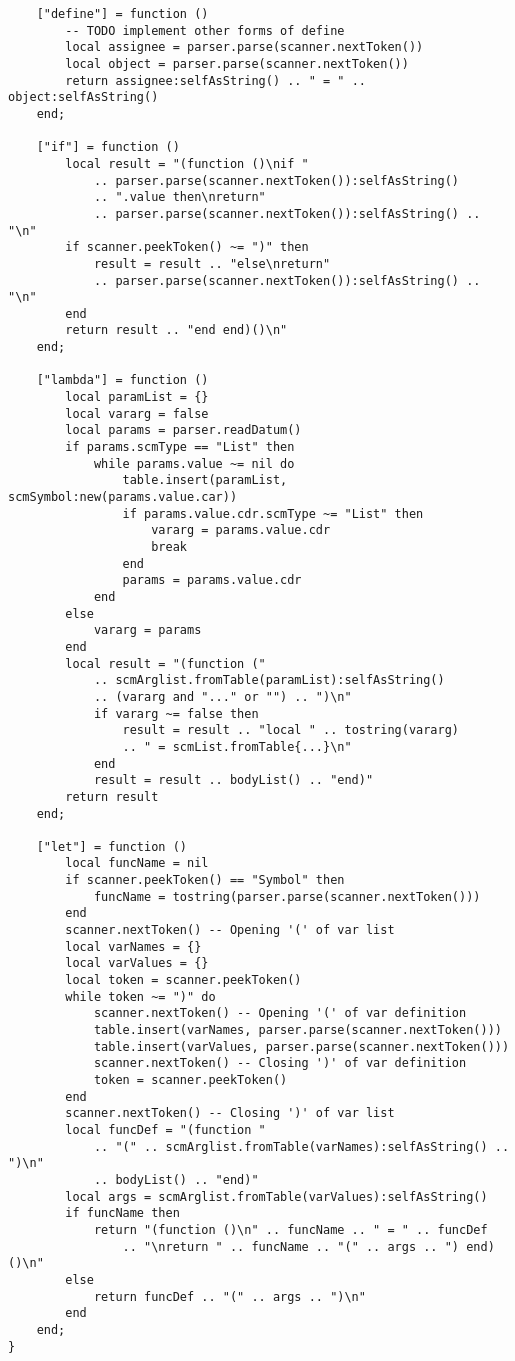 \begin{verbatim}
    ["define"] = function ()
        -- TODO implement other forms of define
        local assignee = parser.parse(scanner.nextToken())
        local object = parser.parse(scanner.nextToken())
        return assignee:selfAsString() .. " = " .. object:selfAsString()
    end;

    ["if"] = function ()
        local result = "(function ()\nif "
            .. parser.parse(scanner.nextToken()):selfAsString()
            .. ".value then\nreturn"
            .. parser.parse(scanner.nextToken()):selfAsString() .. "\n"
        if scanner.peekToken() ~= ")" then
            result = result .. "else\nreturn"
            .. parser.parse(scanner.nextToken()):selfAsString() .. "\n"
        end
        return result .. "end end)()\n"
    end;

    ["lambda"] = function ()
        local paramList = {}
        local vararg = false
        local params = parser.readDatum()
        if params.scmType == "List" then
            while params.value ~= nil do
                table.insert(paramList, scmSymbol:new(params.value.car))
                if params.value.cdr.scmType ~= "List" then
                    vararg = params.value.cdr
                    break
                end
                params = params.value.cdr
            end
        else
            vararg = params
        end
        local result = "(function ("
            .. scmArglist.fromTable(paramList):selfAsString()
            .. (vararg and "..." or "") .. ")\n"
            if vararg ~= false then
                result = result .. "local " .. tostring(vararg)
                .. " = scmList.fromTable{...}\n"
            end
            result = result .. bodyList() .. "end)"
        return result
    end;

    ["let"] = function ()
        local funcName = nil
        if scanner.peekToken() == "Symbol" then
            funcName = tostring(parser.parse(scanner.nextToken()))
        end
        scanner.nextToken() -- Opening '(' of var list
        local varNames = {}
        local varValues = {}
        local token = scanner.peekToken()
        while token ~= ")" do
            scanner.nextToken() -- Opening '(' of var definition
            table.insert(varNames, parser.parse(scanner.nextToken()))
            table.insert(varValues, parser.parse(scanner.nextToken()))
            scanner.nextToken() -- Closing ')' of var definition
            token = scanner.peekToken()
        end
        scanner.nextToken() -- Closing ')' of var list
        local funcDef = "(function "
            .. "(" .. scmArglist.fromTable(varNames):selfAsString() .. ")\n"
            .. bodyList() .. "end)"
        local args = scmArglist.fromTable(varValues):selfAsString()
        if funcName then
            return "(function ()\n" .. funcName .. " = " .. funcDef
                .. "\nreturn " .. funcName .. "(" .. args .. ") end)()\n"
        else
            return funcDef .. "(" .. args .. ")\n"
        end
    end;
}


\end{verbatim}
